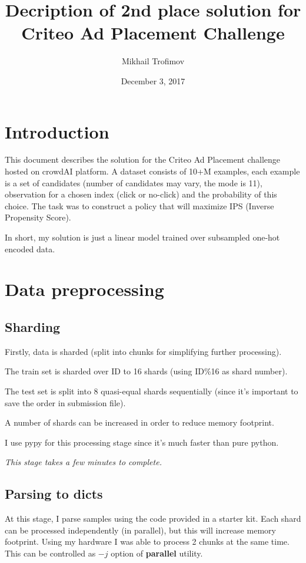 \documentclass[12pt]{article}
\title{Decription of 2nd place solution for \\ Criteo Ad Placement Challenge}
\author{Mikhail Trofimov}
\date{December 3, 2017}
\begin{document}
\maketitle

\section{Introduction}
This document describes the solution for the Criteo Ad Placement challenge hosted on crowdAI platform. A dataset consists of 10+M examples, each example is a set of candidates (number of candidates may vary, the mode is 11), observation for a chosen index (click or no-click) and the probability of this choice. The task was to construct a policy that will maximize IPS (Inverse Propensity Score). 

In short, my solution is just a linear model trained over subsampled one-hot encoded data.



\section{Data preprocessing}


\subsection{Sharding}
Firstly, data is sharded (split into chunks for simplifying further processing). 

The train set is sharded over ID to 16 shards (using ID\%16 as shard number). 

The test set is split into 8 quasi-equal shards sequentially (since it's important to save the order in submission file). 

A number of shards can be increased in order to reduce memory footprint. 

I use pypy for this processing stage since it's much faster than pure python.

\textit{This stage takes a few minutes to complete.}


\subsection{Parsing to dicts}
At this stage, I parse samples using the code provided in a starter kit. Each shard can be processed independently (in parallel), but this will increase memory footprint. Using my hardware I was able to process 2 chunks at the same time. This can be controlled as $-j$ option of \textbf{parallel} utility.
\end{document}
